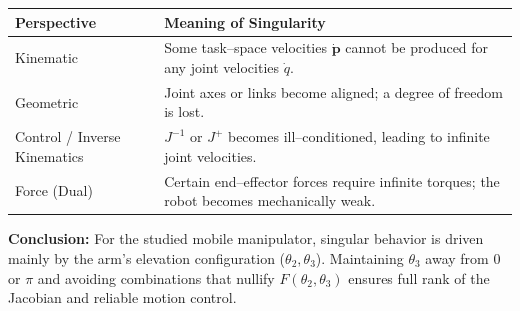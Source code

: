 \documentclass[12pt,a4paper]{article}
\begin{document}
\begin{center}
\begin{tabular}{|l|p{9cm}|}
\hline
\textbf{Perspective} & \textbf{Meaning of Singularity} \\ \hline
Kinematic &
Some task--space velocities $\dot{\bm{p}}$ cannot be produced for any joint velocities $\dot{q}$. \\
\hline
Geometric &
Joint axes or links become aligned; a degree of freedom is lost. \\
\hline
Control / Inverse Kinematics &
$J^{-1}$ or $J^{+}$ becomes ill--conditioned, leading to infinite joint velocities. \\
\hline
Force (Dual) &
Certain end--effector forces require infinite torques; the robot becomes mechanically weak. \\
\hline
\end{tabular}
\end{center}

\bigskip
\textbf{Conclusion:}
For the studied mobile manipulator,
singular behavior is driven mainly by the arm’s elevation configuration
(\(\theta_2,\theta_3\)).
Maintaining $\theta_3$ away from $0$ or $\pi$ and avoiding
combinations that nullify $F(\theta_2,\theta_3)$
ensures full rank of the Jacobian and reliable motion control.
\end{document}
